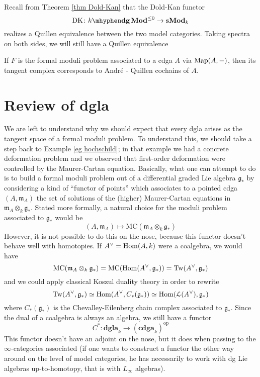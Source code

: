 \begin{refsection}
Recall from Theorem \ref{thm Dold-Kan} that the Dold-Kan functor
\[
\mathrm{DK} \colon \dgMod{k}^{\le 0} \to \sMod{k}
\]
realizes a Quillen equivalence between the two model categories. Taking spectra on both sides, we will still have a Quillen equivalence 

\begin{eg}
If $F$ is the formal moduli problem associated to a cdga $A$ via $\operatorname{\mathrm{Map}}(A,-)$, then its tangent complex corresponds to Andr\'e - Quillen cochains of $A$.
\end{eg}

\section{Review of dgla}

We are left to understand why we should expect that every dgla arises as the tangent space of a formal moduli problem. To understand this, we should take a step back to Example \ref{eg hochschild}; in that example we had a concrete deformation problem and we observed that first-order deformation were controlled by the Maurer-Cartan equation. Basically, what one can attempt to do is to build a formal moduli problem out of a differential graded Lie algebra $\mathfrak g_*$ by considering a kind of ``functor of points'' which associates to a pointed cdga $(A,\mathfrak m_A)$ the set of solutions of the (higher) Maurer-Cartan equations in $\mathfrak m_A \otimes_k \mathfrak g_*$. Stated more formally, a natural choice for the moduli problem associated to $\mathfrak g_*$ would be
\[
(A, \mathfrak m_A) \mapsto \mathrm{MC}(\mathfrak m_A \otimes_k \mathfrak g_*)
\]
However, it is not possible to do this on the nose, because this functor doesn't behave well with homotopies. If $A^\vee = \mathrm{Hom}(A,k)$ were a coalgebra, we would have
\[
\mathrm{MC}(\mathfrak m_A \otimes_k \mathfrak g_*) = \mathrm{MC}(\mathrm{Hom}(A^\vee, \mathfrak g_*)) = \mathrm{Tw}(A^\vee, \mathfrak g_*)
\]
and we could apply classical Koszul duality theory in order to rewrite
\[
\mathrm{Tw}(A^\vee, \mathfrak g_*) \simeq \mathrm{Hom}(A^\vee, C_*(\mathfrak g_*)) \simeq \mathrm{Hom}(\mathcal L(A^\vee), \mathfrak g_*)
\]
where $C_*(\mathfrak g_*)$ is the Chevalley-Eilenberg chain complex associated to $\mathfrak g_*$. Since the dual of a coalgebra is always an algebra, we still have a functor
\[
C^* \colon \mathbf{dgla}_k \to (\mathbf{cdga}_k)^{\mathrm{op}}
\]
This functor doesn't have an adjoint on the nose, but it does when passing to the $\infty$-categories associated (if one wants to construct a functor the other way around on the level of model categories, he has necessarily to work with dg Lie algebras up-to-homotopy, that is with $L_\infty$ algebras).


\end{refsection}
